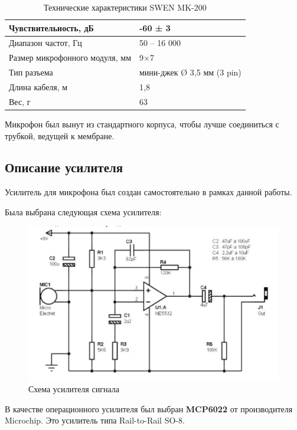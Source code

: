 \documentclass[14pt]{extarticle}
\begin{document}
\begin{table}[h]
\centering
\label{my-label}
\begin{tabular}{|l|l|}
\hline
Чувствительность, дБ           & -60 ± 3                    \\ \hline
Диапазон частот, Гц            & 50 – 16 000                \\ \hline
Размер микрофонного модуля, мм & 9×7                        \\ \hline
Тип разъема                    & мини-джек Ø 3,5 мм (3 pin) \\ \hline
Длина кабеля, м                & 1,8                        \\ \hline
Вес, г                         & 63                         \\ \hline
\end{tabular}
\caption{Технические характеристики SWEN MK-200}
\end{table}

Микрофон был вынут из стандартного корпуса, чтобы лучше соединиться с трубкой, ведущей к мембране.

\subsection{Описание усилителя}
Усилитель для микрофона был создан самостоятельно в рамках данной работы.

Была выбрана следующая схема усилителя:

\begin{figure}[H]
\centering
\includegraphics[width=14cm]{images/circuit.jpg}
\caption{Схема усилителя сигнала}
\end{figure}

В качестве операционного усилителя был выбран \textbf{MCP6022} от производителя Microchip. Это усилитель типа Rail-to-Rail SO-8.
\end{document}
